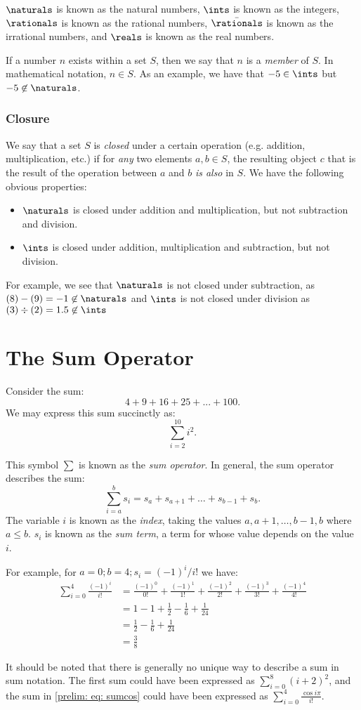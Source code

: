   $\naturals$ is known as the natural numbers, $\ints$ is known as the integers, $\rationals$ is known as the rational numbers, $\bar{\rationals}$ is known as the irrational numbers, and $\reals$ is known as the real numbers.

  If a number $n$ exists within a set $S$, then we say that $n$ is a \emph{member} of $S$.
  In mathematical notation, $n \in S$. As an example, we have that $-5 \in \ints$ but $-5 \not\in \naturals$.

  \subsubsection*{Closure}
  We say that a set $S$ is \emph{closed} under a certain operation (e.g. addition, multiplication, etc.)
  if for \emph{any} two elements $a, b \in S$, the resulting object $c$ that is the result of the
  operation between $a$ and $b$ \emph{is also} in $S$. We have the following obvious properties:
  \begin{itemize}
    \item $\naturals$ is closed under addition and multiplication, but not subtraction and division.
    \item $\ints$ is closed under addition, multiplication and subtraction, but not division.
  \end{itemize}

  For example, we see that $\naturals$ is not closed under subtraction, as $(8) - (9) = -1 \not \in \naturals$ and
  $\ints$ is not closed under division as $(3) \div (2) = 1.5 \not\in \ints $


\section{The Sum Operator}
  \newcommand{\negfrac}[1]{\frac{ (-1)^{#1} }{ #1! } }

  Consider the sum: $$ 4 + 9 + 16 + 25 + ... + 100. $$
  We may express this sum succinctly as: $$ \sum_{i=2}^{10}{i^2}. $$

  This symbol $\sum$ is known as the \emph{sum operator}. In general, the sum operator describes the sum: $$ \sum_{i=a}^{b}{s_i} = s_a + s_{a+1} + \ldots + s_{b-1} + s_b. $$
  The variable $i$ is known as the \emph{index}, taking the values $a, a+1, \ldots, b-1, b$ where $a \leq b$. $s_i$
  is known as the \emph{sum term}, a term for whose value depends on the value $i$.

  For example, for $a = 0; b = 4; s_i = (-1)^i/i!$ we have:
  \begin{align}
    \sum_{i=0}^{4}{\frac{(-1)^i}{i!}} &= \negfrac{0} + \negfrac{1} + \negfrac{2} + \negfrac{3} + \negfrac{4}  \label{prelim: eq: sumcos} \\
                                      &= 1 - 1 + \frac{1}{2} - \frac{1}{6} + \frac{1}{24} \\
                                      &= \frac{1}{2} - \frac{1}{6} + \frac{1}{24} \\
                                      &= \frac{3}{8}
  \end{align}

  It should be noted that there is generally no unique way to describe a sum in sum notation. The first sum could have been expressed as $\sum_{i=0}^{8}{(i+2)^2}$, and the sum in \ref{prelim: eq: sumcos} could have been expressed as $\sum_{i=0}^{4}{ \frac{\cos{i\pi}} {i!} }.$
